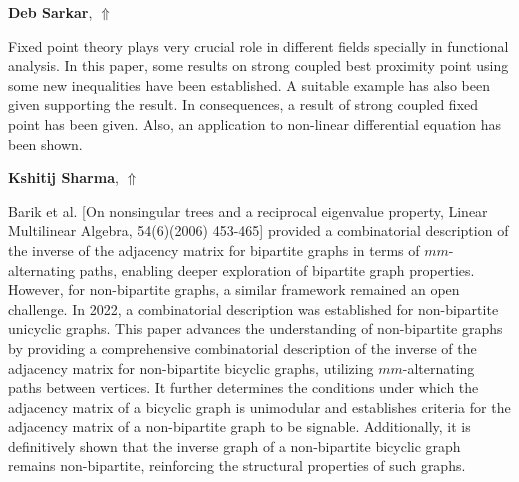 \documentclass[ILAS2025-program.tex]{subfiles}
\begin{document}
\hypertarget{down0421}{}\begin{ilasabstract}
    
\textbf{Deb Sarkar},  \hfill \hyperlink{up0421}{$\Uparrow$}
    
    
\mtskip
    Fixed point theory plays very crucial role in different fields specially in functional analysis. In this paper, some results on strong coupled best proximity point using some new inequalities have been established. A suitable example has also been given supporting the result. In consequences, a result of strong coupled fixed point has been given. Also, an application to non-linear differential equation has been shown. 
\end{ilasabstract}
    

\hypertarget{down0093}{}\begin{ilasabstract}
    
\textbf{Kshitij Sharma},  \hfill \hyperlink{up0093}{$\Uparrow$}
    
    
\mtskip
    Barik et al. [On nonsingular trees and a reciprocal eigenvalue property, Linear Multilinear Algebra, 54(6)(2006) 453-465] provided a combinatorial description of the inverse of the adjacency matrix for bipartite graphs in terms of $mm$-alternating paths, enabling deeper exploration of bipartite graph properties. However, for non-bipartite graphs, a similar framework remained an open challenge. In 2022, a combinatorial description was established for non-bipartite unicyclic graphs.
This paper advances the understanding of non-bipartite graphs by providing a comprehensive combinatorial description of the inverse of the adjacency matrix for non-bipartite bicyclic graphs, utilizing $mm$-alternating paths between vertices. It further determines the conditions under which the adjacency matrix of a bicyclic graph is unimodular and establishes criteria for the adjacency matrix of a non-bipartite graph to be signable. Additionally, it is definitively shown that the inverse graph of a non-bipartite bicyclic graph remains non-bipartite, reinforcing the structural properties of such graphs.


\end{ilasabstract}
    
\end{document}
